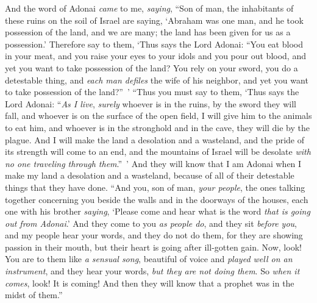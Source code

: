 \begin{biblechapter}
\verse And the word of Adonai \textit{came} to me, \textit{saying},
\verse “Son of man, the inhabitants of these ruins on the soil of Israel are saying, ‘Abraham was one man, and he took possession of the land, and we are many; the land has been given for us as a possession.’
\verse Therefore say to them, ‘Thus says the Lord Adonai: “You eat blood in your meat, and you raise your eyes to your idols and you pour out blood, and yet you want to take possession of the land?
\verse You rely on your sword, you do a detestable thing, and \textit{each man defiles} the wife of his neighbor, and yet you want to take possession of the land?” ’
\verse “Thus you must say to them, ‘Thus says the Lord Adonai: “\textit{As I live}, \textit{surely} whoever is in the ruins, by the sword they will fall, and whoever is on the surface of the open field, I will give him to the animals to eat him, and whoever is in the stronghold and in the cave, they will die by the plague.
\verse And I will make the land a desolation and a wasteland, and the pride of its strength will come to an end, and the mountains of Israel will be desolate \textit{with no one traveling through them}.” ’
\verse And they will know that I am Adonai when I make my land a desolation and a wasteland, because of all of their detestable things that they have done.
\verse “And you, son of man, \textit{your people}, the ones talking together concerning you beside the walls and in the doorways of the houses, each one with his brother \textit{saying}, ‘Please come and hear what is the word \textit{that is going out from Adonai}.’
\verse And they come to you \textit{as people do}, and they sit \textit{before you}, and my people hear your words, and they do not do them, for they are showing passion in their mouth, but their heart is going after ill-gotten gain.
\verse Now, look! You are to them like \textit{a sensual song}, beautiful of voice and \textit{played well on an instrument}, and they hear your words, \textit{but they are not doing them}.
\verse So \textit{when it comes}, look! It is coming! And then they will know that a prophet was in the midst of them.”
\end{biblechapter}

